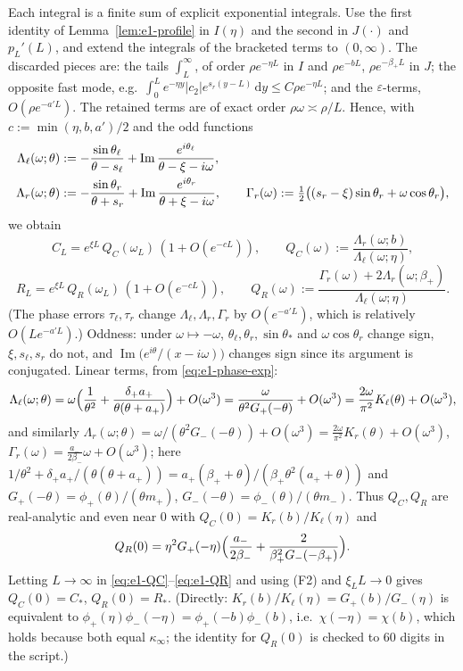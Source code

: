 \documentclass[11pt,a4paper]{article}
\theoremstyle{definition}
\theoremstyle{remark}
\newcommand{\1}{\mathbf 1}
\newcommand{\dd}{\,\mathrm d}
\begin{document}
Each integral is a finite sum of explicit exponential integrals. Use the first
identity of Lemma~\ref{lem:e1-profile} in $I(\eta)$ and the second in $J(\cdot)$ and
$p_L'(L)$, and extend the integrals of the bracketed terms to $(0,\infty)$. The
discarded pieces are: the tails $\int_L^\infty$, of order $\rho e^{-\eta L}$ in $I$ and
$\rho e^{-bL}$, $\rho e^{-\beta_+L}$ in $J$; the opposite fast mode, e.g.\
$\int_0^Le^{-\eta y}|c_2|e^{s_r(y-L)}\dd y\le C\rho e^{-\eta L}$; and the $\varepsilon$-terms,
$O(\rho e^{-a'L})$. The retained terms are of exact order $\rho\omega\asymp\rho/L$. Hence, with $c:=\min(\eta,b,a')/2$ and the odd functions
\begin{align}
\Lambda_\ell(\omega;\theta)&:=-\frac{\sin\theta_\ell}{\theta-s_\ell}+\operatorname{Im}\frac{e^{i\theta_\ell}}{\theta-\xi-i\omega},\notag\\
\Lambda_r(\omega;\theta)&:=-\frac{\sin\theta_r}{\theta+s_r}+\operatorname{Im}\frac{e^{i\theta_r}}{\theta+\xi-i\omega},\qquad
\Gamma_r(\omega):=\tfrac12\bigl((s_r-\xi)\sin\theta_r+\omega\cos\theta_r\bigr),\notag
\end{align}
we obtain
\begin{equation}\label{eq:e1-QC}
C_L=e^{\xi L}\,Q_C(\omega_L)\,(1+O(e^{-cL})),\qquad Q_C(\omega):=\frac{\Lambda_r(\omega;b)}{\Lambda_\ell(\omega;\eta)},
\end{equation}
\begin{equation}\label{eq:e1-QR}
R_L=e^{\xi L}\,Q_R(\omega_L)\,(1+O(e^{-cL})),\qquad Q_R(\omega):=\frac{\Gamma_r(\omega)+2\Lambda_r(\omega;\beta_+)}{\Lambda_\ell(\omega;\eta)} .
\end{equation}
(The phase errors $\tau_\ell,\tau_r$ change $\Lambda_\ell,\Lambda_r,\Gamma_r$ by $O(e^{-a'L})$,
which is relatively $O(Le^{-a'L})$.) Oddness: under $\omega\mapsto-\omega$,
$\theta_\ell,\theta_r,\sin\theta_\ast$ and $\omega\cos\theta_r$ change sign, $\xi,s_\ell,s_r$ do not, and
$\operatorname{Im}\bigl(e^{i\theta}/(x-i\omega)\bigr)$ changes sign since its argument is conjugated.
Linear terms, from \eqref{eq:e1-phase-exp}:
\[
\Lambda_\ell(\omega;\theta)=\omega\Bigl(\frac1{\theta^2}+\frac{\delta_+a_+}{\theta(\theta+a_+)}\Bigr)+O(\omega^3)
=\frac{\omega}{\theta^2G_+(-\theta)}+O(\omega^3)=\frac{2\omega}{\pi^2}K_\ell(\theta)+O(\omega^3),
\]
and similarly $\Lambda_r(\omega;\theta)=\omega/(\theta^2G_-(-\theta))+O(\omega^3)=\frac{2\omega}{\pi^2}K_r(\theta)+O(\omega^3)$,
$\Gamma_r(\omega)=\frac{a_-}{2\beta_-}\omega+O(\omega^3)$; here
$1/\theta^2+\delta_+a_+/(\theta(\theta+a_+))=a_+(\beta_++\theta)/(\beta_+\theta^2(a_++\theta))$ and
$G_+(-\theta)=\phi_+(\theta)/(\theta m_+)$, $G_-(-\theta)=\phi_-(\theta)/(\theta m_-)$.
Thus $Q_C,Q_R$ are real-analytic and even near $0$ with $Q_C(0)=K_r(b)/K_\ell(\eta)$ and
\[
Q_R(0)=\eta^2G_+(-\eta)\Bigl(\frac{a_-}{2\beta_-}+\frac{2}{\beta_+^2G_-(-\beta_+)}\Bigr).
\]
Letting $L\to\infty$ in \eqref{eq:e1-QC}--\eqref{eq:e1-QR} and using (F2) and $\xi_LL\to0$ gives
$Q_C(0)=C_*$, $Q_R(0)=R_*$. (Directly: $K_r(b)/K_\ell(\eta)=G_+(b)/G_-(\eta)$ is equivalent to
$\phi_+(\eta)\phi_-(-\eta)=\phi_+(-b)\phi_-(b)$, i.e.\ $\chi(-\eta)=\chi(b)$, which holds because
both equal $\kappa_\infty$; the identity for $Q_R(0)$ is checked to 60 digits in the script.)
\end{document}
